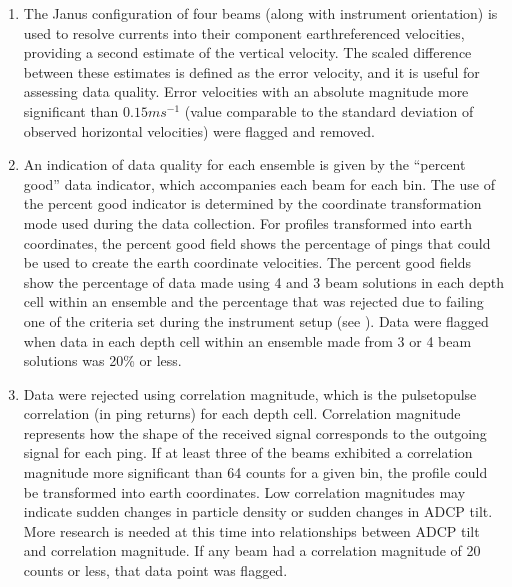 \documentclass[a4paper,10pt,english,openany,oneside]{sphinxmanual}
\begin{document}
\begin{enumerate}
\item {} 
\sphinxAtStartPar
The Janus configuration of four beams (along with instrument orientation)
is used to resolve currents into their component earth\sphinxhyphen{}referenced
velocities, providing a second estimate of the vertical velocity. The scaled
difference between these estimates is defined as the error velocity, and it
is useful for assessing data quality. Error velocities with an absolute
magnitude more significant than \(0.15 ms^{-1}\) (value comparable to
the standard deviation of observed horizontal velocities) were flagged and
removed.

\item {} 
\sphinxAtStartPar
An indication of data quality for each ensemble is given by the “percent
good” data indicator, which accompanies each beam for each bin. The use of
the percent good indicator is determined by the coordinate transformation
mode used during the data collection. For profiles transformed into earth
coordinates, the percent good field shows the percentage of pings that could
be used to create the earth coordinate velocities. The percent good fields
show the percentage of data made using 4 and 3 beam solutions in each depth
cell within an ensemble and the percentage that was rejected due to failing
one of the criteria set during the instrument setup (see
{\hyperref[\detokenize{appendices:whots-19-300-khz-serial-4891}]{}}). Data were flagged when
data in each depth cell within an ensemble made from 3 or 4 beam solutions
was 20\% or less.

\item {} 
\sphinxAtStartPar
Data were rejected using correlation magnitude, which is the pulse\sphinxhyphen{}to\sphinxhyphen{}pulse
correlation (in ping returns) for each depth cell. Correlation magnitude
represents how the shape of the received signal corresponds to the outgoing
signal for each ping. If at least three of the beams exhibited a correlation
magnitude more significant than 64 counts for a given bin, the profile could
be transformed into earth coordinates. Low correlation magnitudes may
indicate sudden changes in particle density or sudden changes in ADCP tilt.
More research is needed at this time into relationships between ADCP tilt
and correlation magnitude. If any beam had a correlation magnitude of 20
counts or less, that data point was flagged.


\end{enumerate}
\end{document}
